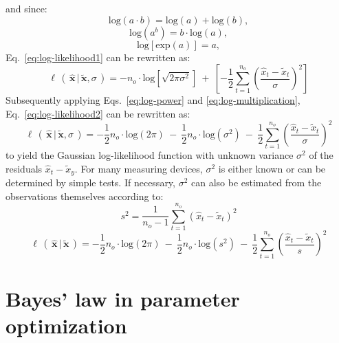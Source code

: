 and since:
\begin{equation}\label{eq:log-multiplication}
\mathrm{log}\left(a\cdot{}b\right) = \mathrm{log}\left(a\right) + \mathrm{log}\left(b\right),
\end{equation}
\begin{equation}\label{eq:log-power}
\mathrm{log}\left(a^b\right) = b \cdot \mathrm{log}\left(a\right),
\end{equation}
\begin{equation}
\mathrm{log}\left[\mathrm{exp}\left(a\right)\right] = a,
\end{equation}
Eq.~\ref{eq:log-likelihood1} can be rewritten as:
\begin{equation}\label{eq:log-likelihood2}
\ell\,(\,\hat{\mathbf{x}}\,|\,\tilde{\mathbf{x}},\sigma\,) = -n_o \cdot{} \mathrm{log}\left[\sqrt{2\pi\sigma^2}\right]\:+\:\left[-\frac{1}{2}\sum_{t=1}^{n_o}\left(\frac{\hat{x}_t-\tilde{x}_t}{\sigma}\right)^2\right]
\end{equation}
Subsequently applying Eqs.~\ref{eq:log-power} and \ref{eq:log-multiplication}, Eq.~\ref{eq:log-likelihood2} can be rewritten as:
\begin{equation}\label{eq:log-likelihood3}
\ell\,(\,\hat{\mathbf{x}}\,|\,\tilde{\mathbf{x}},\sigma\,) = -\frac{1}{2}n_o\cdot{}\mathrm{log}\left(2\pi\right)\:-\:\frac{1}{2}n_o\cdot{}\mathrm{log}\left(\sigma^2\right)\:-\:\frac{1}{2}\sum_{t=1}^{n_o}\left(\frac{\hat{x}_t-\tilde{x}_t}{\sigma}\right)^2
\end{equation}
to yield the Gaussian log-likelihood function with unknown variance $\sigma^2$ of the residuals $\hat{x}_t-\tilde{x}_y$. For many measuring devices, $\sigma^2$ is either known or can be determined by simple tests. If necessary, $\sigma^2$ can also be estimated from the observations themselves according to:
\begin{equation}\label{eq:variance-estimator}
s^2 = \frac{1}{n_o-1}\sum_{t=1}^{n_o}\left(\hat{x}_t-\tilde{x}_t\right)^2
\end{equation}
\begin{equation}\label{eq:log-likelihood4}
\ell\,(\,\hat{\mathbf{x}}\,|\,\tilde{\mathbf{x}}\,) = -\frac{1}{2}n_o\cdot{}\mathrm{log}\left(2\pi\right)\:-\:\frac{1}{2}n_o\cdot{}\mathrm{log}\left(s^2\right)\:-\:\frac{1}{2}\sum_{t=1}^{n_o}\left(\frac{\hat{x}_t-\tilde{x}_t}{s}\right)^2
\end{equation}




\section{Bayes' law in parameter optimization}


